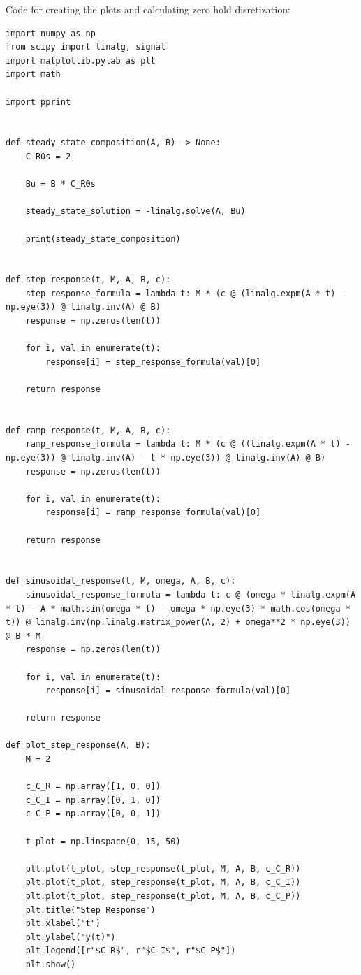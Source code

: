 \documentclass[12pt]{article}
\begin{document}
\begin{enumerate}
\begin{enumerate}
    Code for creating the plots and calculating zero hold disretization:

\begin{verbatim}
import numpy as np
from scipy import linalg, signal
import matplotlib.pylab as plt
import math

import pprint


def steady_state_composition(A, B) -> None:
    C_R0s = 2

    Bu = B * C_R0s

    steady_state_solution = -linalg.solve(A, Bu)

    print(steady_state_composition)


def step_response(t, M, A, B, c):
    step_response_formula = lambda t: M * (c @ (linalg.expm(A * t) - np.eye(3)) @ linalg.inv(A) @ B)
    response = np.zeros(len(t))

    for i, val in enumerate(t):
        response[i] = step_response_formula(val)[0]

    return response


def ramp_response(t, M, A, B, c):
    ramp_response_formula = lambda t: M * (c @ ((linalg.expm(A * t) - np.eye(3)) @ linalg.inv(A) - t * np.eye(3)) @ linalg.inv(A) @ B)
    response = np.zeros(len(t))

    for i, val in enumerate(t):
        response[i] = ramp_response_formula(val)[0]

    return response


def sinusoidal_response(t, M, omega, A, B, c):
    sinusoidal_response_formula = lambda t: c @ (omega * linalg.expm(A * t) - A * math.sin(omega * t) - omega * np.eye(3) * math.cos(omega * t)) @ linalg.inv(np.linalg.matrix_power(A, 2) + omega**2 * np.eye(3)) @ B * M
    response = np.zeros(len(t))

    for i, val in enumerate(t):
        response[i] = sinusoidal_response_formula(val)[0]

    return response

def plot_step_response(A, B):
    M = 2

    c_C_R = np.array([1, 0, 0])
    c_C_I = np.array([0, 1, 0])
    c_C_P = np.array([0, 0, 1])

    t_plot = np.linspace(0, 15, 50)

    plt.plot(t_plot, step_response(t_plot, M, A, B, c_C_R))
    plt.plot(t_plot, step_response(t_plot, M, A, B, c_C_I))
    plt.plot(t_plot, step_response(t_plot, M, A, B, c_C_P))
    plt.title("Step Response")
    plt.xlabel("t")
    plt.ylabel("y(t)")
    plt.legend([r"$C_R$", r"$C_I$", r"$C_P$"])
    plt.show()



\end{verbatim}
\end{enumerate}
\end{enumerate}
\end{document}
